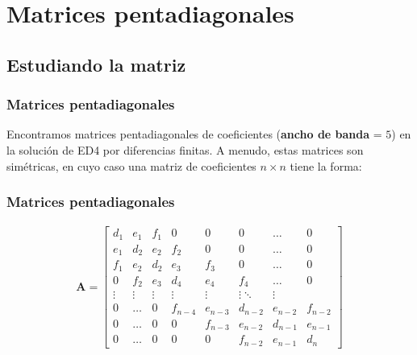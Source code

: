 \documentclass[12pt]{beamer}
\begin{document}
\section{Matrices pentadiagonales}
\subsection{Estudiando la matriz}

\begin{frame}
\frametitle{Matrices pentadiagonales}
Encontramos matrices pentadiagonales de coeficientes (\textbf{\textcolor{cadet}{ancho de banda}} = $5$) en la solución de ED4 por diferencias finitas. A menudo, estas matrices son simétricas, en cuyo caso una matriz de coeficientes $n \times n$ tiene la forma:
\end{frame}
\begin{frame}
\frametitle{Matrices pentadiagonales}
\renewcommand{\arraystretch}{0.9}
\begin{align}
\mathbf{A} =
\begin{bmatrix}
d_{1} & e_{1} & f_{1} & 0 & 0 & 0 & \ldots & 0 \\
e_{1} & d_{2} & e_{2} & f_{2} & 0 & 0 & \ldots & 0 \\
f_{1} & e_{2} & d_{2} & e_{3} & f_{3} & 0 & \ldots & 0 \\
0 & f_{2} & e_{3} & d_{4} & e_{4} & f_{4} & \ldots & 0 \\
\vdots & \vdots & \vdots & \vdots & \vdots & \vdots \ddots & \vdots \\
0 & \ldots & 0 & f_{n-4} & e_{n-3} & d_{n-2} & e_{n-2} &f_{n-2} \\
0 & \ldots & 0 & 0 & f_{n-3} & e_{n-2} & d_{n-1} & e_{n-1} \\
0 & \ldots & 0 & 0 & 0 & f_{n-2} & e_{n-1} & d_{n}
\end{bmatrix}
\label{eq:ecuacion_02_26}
\end{align}
\end{frame}
\end{document}
